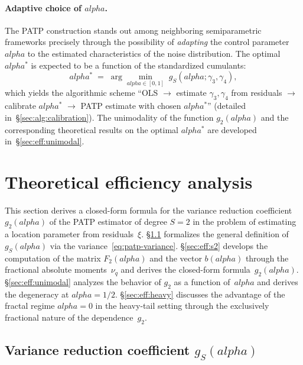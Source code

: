 \documentclass[11pt]{article}
\def\alpha{alpha}%
\def\vec#1{#1}%
\def\mathbf#1{#1}%
\theoremstyle{definition}
\begin{document}
\paragraph{Adaptive choice of $\alpha$.}
The PATP construction stands out among neighboring semiparametric frameworks
precisely through the possibility of \emph{adapting} the control parameter
$\alpha$ to the estimated characteristics of the noise distribution.
The optimal $\alpha^{*}$ is expected to be a function of the standardized
cumulants:
\begin{equation}\label{eq:alpha-optimal}
  \alpha^{*}
  \;=\; \arg\min_{\alpha \in [0, 1]}\; g_S(\alpha; \gamma_3, \gamma_4),
\end{equation}
which yields the algorithmic scheme ``OLS $\to$ estimate $\gamma_3, \gamma_4$
from residuals $\to$ calibrate $\alpha^{*}$ $\to$ PATP estimate with chosen
$\alpha^{*}$'' (detailed in~\S\ref{sec:alg:calibration}).
The unimodality of the function $g_2(\alpha)$ and the corresponding
theoretical results on the optimal $\alpha^{*}$ are developed
in~\S\ref{sec:eff:unimodal}.


\section{Theoretical efficiency analysis}\label{sec:efficiency}

This section derives a closed-form formula for the variance reduction
coefficient $g_2(\alpha)$ of the PATP estimator of degree $S = 2$ in the
problem of estimating a location parameter from residuals~$\xi$.
\S\ref{sec:eff:gs} formalizes the general definition of $g_S(\alpha)$ via
the variance~\eqref{eq:patp-variance}. \S\ref{sec:eff:s2} develops the
computation of the matrix $\mathbf{F}_2(\alpha)$ and the vector
$\vec b(\alpha)$ through the fractional absolute moments~$\nu_q$ and
derives the closed-form formula~$g_2(\alpha)$. \S\ref{sec:eff:unimodal}
analyzes the behavior of $g_2$ as a function of~$\alpha$ and derives the
degeneracy at $\alpha = 1/2$. \S\ref{sec:eff:heavy} discusses the
advantage of the fractal regime $\alpha = 0$ in the heavy-tail setting
through the exclusively fractional nature of the dependence~$g_2$.

\subsection[Variance reduction coefficient gS(alpha)]{Variance reduction coefficient $g_S(\alpha)$}\label{sec:eff:gs}
\end{document}
